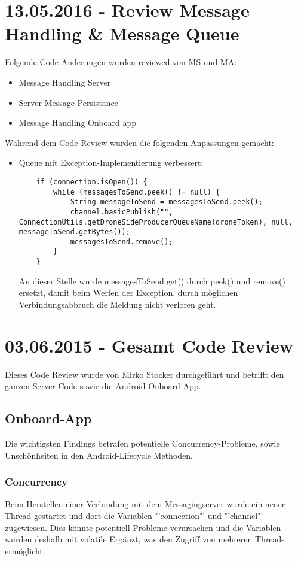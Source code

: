 \section{13.05.2016 - Review Message Handling \& Message Queue}
Folgende Code-Änderungen wurden reviewed von MS und MA:
\begin{itemize}
	\item{Message Handling Server}
	\item{Server Message Persistance}
	\item{Message Handling Onboard app}
\end{itemize}
Während dem Code-Review wurden die folgenden Anpassungen gemacht:
\begin{itemize}
	\item{Queue mit Exception-Implementierung verbessert:
	\begin{lstlisting}
    if (connection.isOpen()) {
        while (messagesToSend.peek() != null) {
            String messageToSend = messagesToSend.peek();
            channel.basicPublish("", ConnectionUtils.getDroneSideProducerQueueName(droneToken), null, messageToSend.getBytes());
            messagesToSend.remove();
        }
    }
	\end{lstlisting}
	An dieser Stelle wurde messagesToSend.get() durch peek() und remove() ersetzt, damit beim Werfen der Exception, durch möglichen Verbindungsabbruch die Meldung nicht verloren geht.}

\end{itemize}
\section{03.06.2015 - Gesamt Code Review}

Dieses Code Review wurde von Mirko Stocker durchgeführt und betrifft den ganzen Server-Code sowie die Android Onboard-App.

\subsection{Onboard-App}
	 
Die wichtigsten Findings betrafen potentielle Concurrency-Probleme, sowie Unschönheiten in den Android-Lifecycle Methoden.

\subsubsection{Concurrency}

Beim Herstellen einer Verbindung mit dem Messagingserver wurde ein neuer Thread gestartet und dort die Variablen "'connection"' und "'channel"' zugewiesen.
Dies könnte potentiell Probleme verursachen und die Variablen wurden deshalb mit volatile Ergänzt, was den Zugriff von mehreren Threads ermöglicht.

